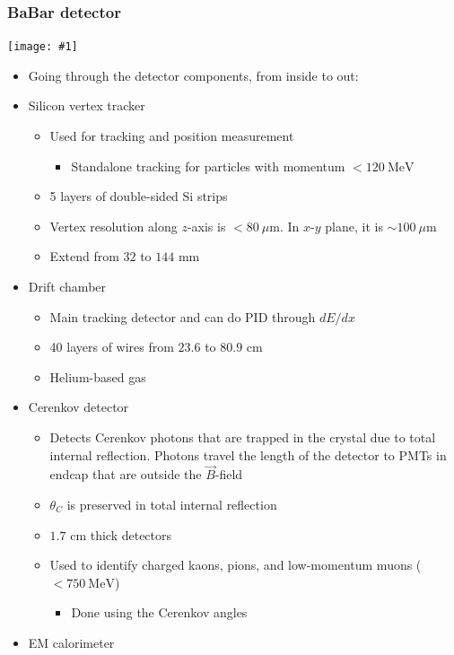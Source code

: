 \documentclass[11pt]{article}
\newcommand{\B}{\ensuremath{\vec{B}}}
\newcommand{\mum}{\mu\text{m}}
\newcommand{\mev}{\text{MeV}}
\newcommand{\embedimgw}[2]{\begin{center}\texttt{[image: \#1]}\end{center}}
\begin{document}
\subsubsection{BaBar detector}
\embedimgw{figs/babardetector.png}{.6}
\begin{itemize}
  \item Going through the detector components, from inside to out:
  \item Silicon vertex tracker
  \begin{itemize}
    \item Used for tracking and position measurement
    \begin{itemize}
      \item Standalone tracking for particles with momentum $<120~\mev$
    \end{itemize}
    \item 5 layers of double-sided Si strips
    \item Vertex resolution along $z$-axis is $<80~\mum$. In $x$-$y$ plane, it is $\sim 100~\mum$
    \item Extend from $32$ to $144$ mm
  \end{itemize}
  \item Drift chamber
  \begin{itemize}
    \item Main tracking detector and can do PID through $dE/dx$
    \item 40 layers of wires from $23.6$ to $80.9$ cm
    \item Helium-based gas
  \end{itemize}
  \item Cerenkov detector
  \begin{itemize}
    \item Detects Cerenkov photons that are trapped in the crystal due to total internal reflection. Photons travel the length of the detector to PMTs in endcap that are outside the \B-field
    \item $\theta_C$ is preserved in total internal reflection
    \item $1.7$ cm thick detectors
    \item Used to identify charged kaons, pions, and low-momentum muons ($<750~\mev$)
    \begin{itemize}
      \item Done using the Cerenkov angles
    \end{itemize}
  \end{itemize}
  \item EM calorimeter

\end{itemize}
\end{document}
